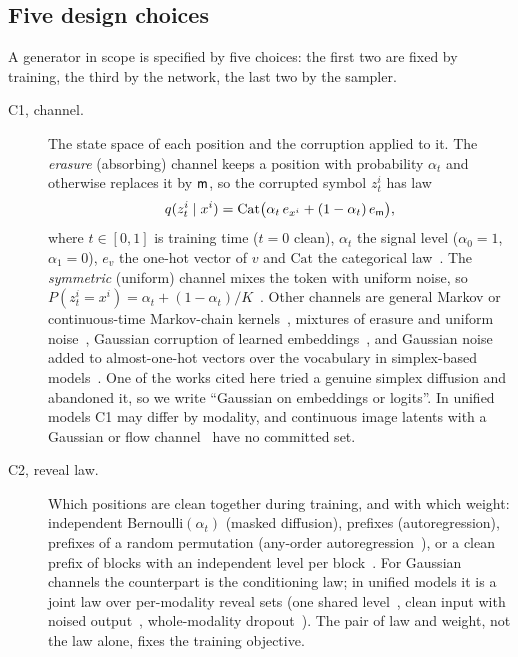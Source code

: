 \subsection{Five design choices}
\label{sec:notation-choices}

A generator in scope is specified by five choices: the first two are fixed by training, the third by the network, the last two by the sampler. %
\begin{description}
  \item[C1, channel.] The state space of each position and the corruption applied to it. The \emph{erasure} (absorbing) channel keeps a position with probability $\alpha_t$ and otherwise replaces it by $\mathsf{m}$, so the corrupted symbol $z_t^i$ has law
  \begin{equation}
    q(z_t^i\mid x^i)=\mathrm{Cat}\big(\alpha_t\,e_{x^i}+(1-\alpha_t)\,e_{\mathsf{m}}\big),
    \label{eq:erasure}
  \end{equation}
  where $t\in[0,1]$ is training time ($t=0$ clean), $\alpha_t$ the signal level ($\alpha_0=1$, $\alpha_1=0$), $e_v$ the one-hot vector of $v$ and $\mathrm{Cat}$ the categorical law~\cite{arXiv:2310.16834,arXiv:2406.07524,arXiv:2406.04329}. The \emph{symmetric} (uniform) channel mixes the token with uniform noise, so $P(z_t^i=x^i)=\alpha_t+(1-\alpha_t)/K$~\cite{arXiv:2107.03006}. Other channels are general Markov or continuous-time Markov-chain kernels~\cite{arXiv:2107.03006,arXiv:2205.14987}, mixtures of erasure and uniform noise~\cite{arXiv:2407.15595}, Gaussian corruption of learned embeddings~\cite{arXiv:2205.14217,arXiv:2211.15089,arXiv:2305.18619}, and Gaussian noise added to almost-one-hot vectors over the vocabulary in simplex-based models~\cite{arXiv:2210.17432}. One of the works cited here tried a genuine simplex diffusion and abandoned it, so we write ``Gaussian on embeddings or logits''. %
  In unified models C1 may differ by modality, and continuous image latents with a Gaussian or flow channel~\cite{arXiv:2408.11039,arXiv:2505.14683,arXiv:2506.15564} have no committed set. %
  \item[C2, reveal law.] Which positions are clean together during training, and with which weight: independent Bernoulli$(\alpha_t)$ (masked diffusion), prefixes (autoregression), prefixes of a random permutation (any-order autoregression~\cite{arXiv:2110.02037}), or a clean prefix of blocks with an independent level per block~\cite{arXiv:2503.09573}. For Gaussian channels the counterpart is the conditioning law; in unified models it is a joint law over per-modality reveal sets (one shared level~\cite{arXiv:2503.20853}, clean input with noised output~\cite{arXiv:2511.09611}, whole-modality dropout~\cite{arXiv:2503.20853}). The pair of law and weight, not the law alone, fixes the training objective. %

\end{description}
